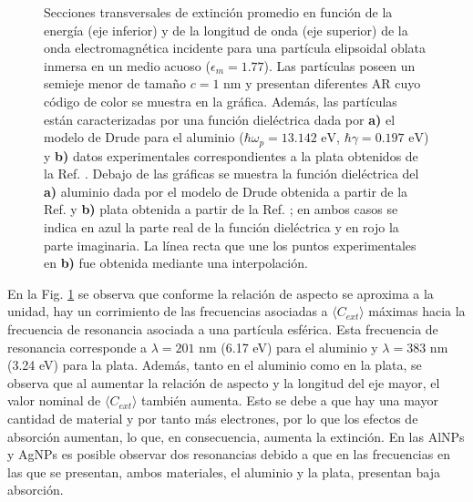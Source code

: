 \begin{figure}[h!]
	\quad%
	\caption{Secciones transversales de extinción promedio en función de la energía (eje inferior) y de la longitud de onda (eje superior) de la onda electromagnética incidente para una partícula elipsoidal oblata inmersa en un medio acuoso ($\epsilon_m=1.77$). Las partículas  poseen un semieje menor de tamaño $c=1$ nm y presentan diferentes AR cuyo código de color se muestra en la gráfica. Además, las partículas están caracterizadas por una función dieléctrica dada por  \textbf{a)} el modelo de Drude para el aluminio ($\hbar\omega_p=13.142\text{ eV}$, $\hbar\gamma=0.197\text{ eV}$) y \textbf{b)} datos experimentales correspondientes a la plata obtenidos de la Ref. \cite{Plata}. Debajo de las gráficas se muestra la función dieléctrica del \textbf{a)} aluminio dada por el modelo de Drude obtenida a partir de la Ref. \cite{Aluminio} y \textbf{b)} plata obtenida a partir de la Ref. \cite{Plata}; en ambos casos se indica en azul la parte real de la función dieléctrica y en rojo la parte imaginaria. La línea recta que une los puntos experimentales en \textbf{b)}  fue obtenida mediante una interpolación.} \label{aluminioplatacc}
\end{figure} 

 En la Fig. \ref{aluminioplatacc} se observa que conforme la relación de aspecto se aproxima a la unidad, hay un corrimiento de las frecuencias asociadas a $\langle C_{ext}\rangle$ máximas hacia la frecuencia de resonancia asociada a una partícula esférica. Esta frecuencia de resonancia corresponde a $\lambda=201\text{ nm}$ (6.17 eV) para el aluminio y $\lambda=383\text{ nm}$ (3.24 eV) para la plata. Además, tanto en el aluminio como en la plata, se observa que al aumentar la relación de aspecto y la longitud del eje mayor, el valor nominal de  $\langle C_{ext}\rangle$ también aumenta. Esto se debe a que hay una mayor cantidad de material y por tanto más electrones, por lo que los efectos de absorción aumentan, lo que, en consecuencia, aumenta la extinción. En las AlNPs y AgNPs es posible observar dos resonancias debido a que en las frecuencias en las que se presentan, ambos materiales, el aluminio y la plata, presentan baja absorción.




